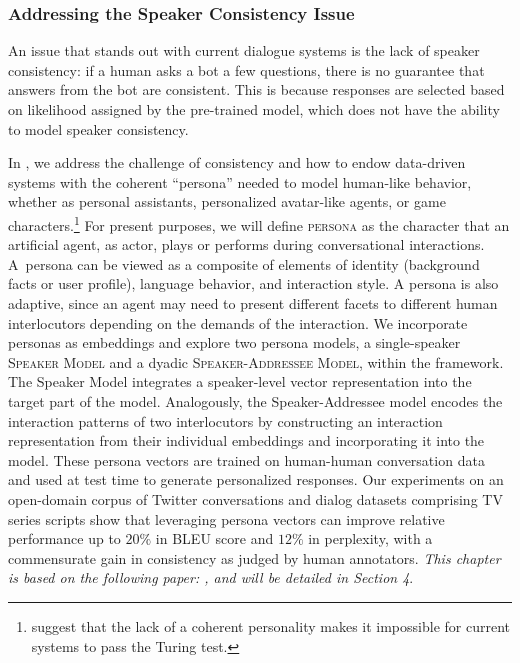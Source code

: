 \subsubsection*{Addressing the Speaker Consistency Issue} 
An issue that stands out with current dialogue systems is the lack of speaker consistency: if a human asks a bot a few questions, there is no guarantee that answers from the bot are consistent. 
This is because 
responses are selected based on likelihood assigned by the pre-trained model, which does not have the ability to model speaker consistency. 

In , we address the challenge of consistency and how to endow data-driven systems with the coherent ``persona'' needed to model human-like behavior, whether as personal assistants, personalized avatar-like agents, or game characters.\footnote{\cite{vinyals2015neural} suggest that the lack of a coherent personality makes it impossible for current systems to pass the Turing test.} 
For present purposes, we will define \textsc{persona} as the character that an artificial agent, as actor, plays or performs during conversational interactions.
A~persona can be viewed as a composite of elements of identity (background facts or user profile), language behavior, and interaction style. 
A persona is also adaptive, since an agent may need to present different facets to different human interlocutors depending on the demands of the interaction. 
We 
 incorporate personas as embeddings and explore two persona models, a single-speaker \textsc{Speaker Model} and a dyadic \textsc{Speaker-Addressee Model}, within the \sts framework. 
The Speaker Model integrates a speaker-level vector representation into the target part of the \sts model.
Analogously, the Speaker-Addressee model encodes the interaction patterns of two interlocutors by constructing an interaction representation from their individual embeddings and incorporating it into the \sts model. 
These persona vectors are trained on human-human conversation data and used at test time to generate personalized responses.
Our experiments on an open-domain corpus of Twitter conversations and dialog datasets comprising TV series scripts show that leveraging persona vectors can improve relative performance up to $20\%$ in BLEU score and $12\%$ in perplexity, with a commensurate gain in consistency as judged by human annotators. 
{\it This chapter is based on the following paper: , and will be detailed in Section 4}. 


